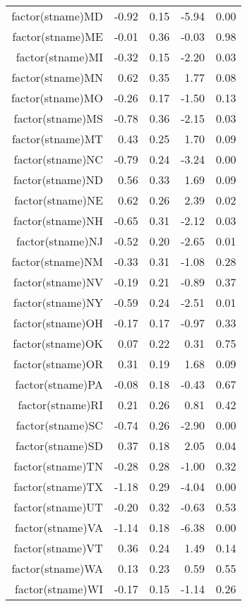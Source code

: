\begin{table}[ht]
\begin{tabular}{rrrrr}
  factor(stname)MD & -0.92 & 0.15 & -5.94 & 0.00 \\ 
  factor(stname)ME & -0.01 & 0.36 & -0.03 & 0.98 \\ 
  factor(stname)MI & -0.32 & 0.15 & -2.20 & 0.03 \\ 
  factor(stname)MN & 0.62 & 0.35 & 1.77 & 0.08 \\ 
  factor(stname)MO & -0.26 & 0.17 & -1.50 & 0.13 \\ 
  factor(stname)MS & -0.78 & 0.36 & -2.15 & 0.03 \\ 
  factor(stname)MT & 0.43 & 0.25 & 1.70 & 0.09 \\ 
  factor(stname)NC & -0.79 & 0.24 & -3.24 & 0.00 \\ 
  factor(stname)ND & 0.56 & 0.33 & 1.69 & 0.09 \\ 
  factor(stname)NE & 0.62 & 0.26 & 2.39 & 0.02 \\ 
  factor(stname)NH & -0.65 & 0.31 & -2.12 & 0.03 \\ 
  factor(stname)NJ & -0.52 & 0.20 & -2.65 & 0.01 \\ 
  factor(stname)NM & -0.33 & 0.31 & -1.08 & 0.28 \\ 
  factor(stname)NV & -0.19 & 0.21 & -0.89 & 0.37 \\ 
  factor(stname)NY & -0.59 & 0.24 & -2.51 & 0.01 \\ 
  factor(stname)OH & -0.17 & 0.17 & -0.97 & 0.33 \\ 
  factor(stname)OK & 0.07 & 0.22 & 0.31 & 0.75 \\ 
  factor(stname)OR & 0.31 & 0.19 & 1.68 & 0.09 \\ 
  factor(stname)PA & -0.08 & 0.18 & -0.43 & 0.67 \\ 
  factor(stname)RI & 0.21 & 0.26 & 0.81 & 0.42 \\ 
  factor(stname)SC & -0.74 & 0.26 & -2.90 & 0.00 \\ 
  factor(stname)SD & 0.37 & 0.18 & 2.05 & 0.04 \\ 
  factor(stname)TN & -0.28 & 0.28 & -1.00 & 0.32 \\ 
  factor(stname)TX & -1.18 & 0.29 & -4.04 & 0.00 \\ 
  factor(stname)UT & -0.20 & 0.32 & -0.63 & 0.53 \\ 
  factor(stname)VA & -1.14 & 0.18 & -6.38 & 0.00 \\ 
  factor(stname)VT & 0.36 & 0.24 & 1.49 & 0.14 \\ 
  factor(stname)WA & 0.13 & 0.23 & 0.59 & 0.55 \\ 
  factor(stname)WI & -0.17 & 0.15 & -1.14 & 0.26 \\ 

\end{tabular}
\end{table}
